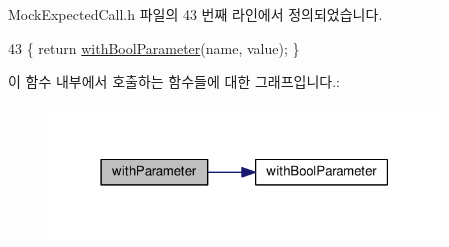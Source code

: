 Mock\+Expected\+Call.\+h 파일의 43 번째 라인에서 정의되었습니다.


\begin{DoxyCode}
43 \{ \textcolor{keywordflow}{return} \hyperlink{class_mock_expected_call_a6863a4109e609a7276dc2abdea6b8a74}{withBoolParameter}(name, value); \}
\end{DoxyCode}


이 함수 내부에서 호출하는 함수들에 대한 그래프입니다.\+:
\nopagebreak
\begin{figure}[H]
\begin{center}
\leavevmode
\includegraphics[width=295pt]{class_mock_expected_call_a9d735dfb585c1351650fcfad40f138bc_cgraph}
\end{center}
\end{figure}




